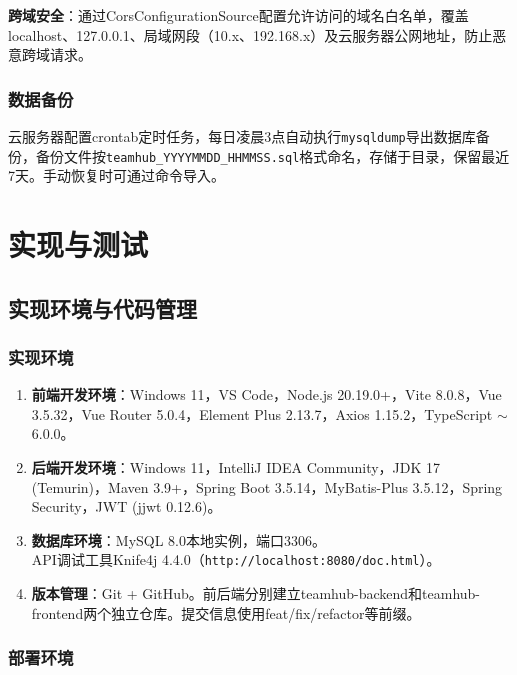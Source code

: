 \documentclass[12pt,a4paper]{ctexart}
\begin{document}
\textbf{跨域安全}：通过CorsConfigurationSource配置允许访问的域名白名单，覆盖localhost、127.0.0.1、局域网段（10.x、192.168.x）及云服务器公网地址，防止恶意跨域请求。

\subsubsection{数据备份}

云服务器配置crontab定时任务，每日凌晨3点自动执行\texttt{mysqldump}导出数据库备份，备份文件按\texttt{teamhub\_YYYYMMDD\_HHMMSS.sql}格式命名，存储于目录，保留最近7天。手动恢复时可通过命令导入。


\newpage
\section{实现与测试}

\subsection{实现环境与代码管理}

\subsubsection{实现环境}

\begin{enumerate}[label=(\arabic*)]
\item \textbf{前端开发环境}：Windows 11，VS Code，Node.js 20.19.0+，Vite 8.0.8，Vue 3.5.32，Vue Router 5.0.4，Element Plus 2.13.7，Axios 1.15.2，TypeScript $\sim$6.0.0。
\item \textbf{后端开发环境}：Windows 11，IntelliJ IDEA Community，JDK 17 (Temurin)，Maven 3.9+，Spring Boot 3.5.14，MyBatis-Plus 3.5.12，Spring Security，JWT (jjwt 0.12.6)。
\item \textbf{数据库环境}：MySQL 8.0本地实例，端口3306。\\API调试工具Knife4j 4.4.0（\texttt{http://localhost:8080/doc.html}）。
\item \textbf{版本管理}：Git + GitHub。前后端分别建立teamhub-backend和teamhub-frontend两个独立仓库。提交信息使用feat/fix/refactor等前缀。
\end{enumerate}

\subsubsection{部署环境}
\end{document}
